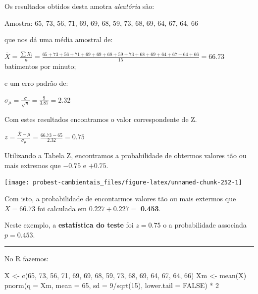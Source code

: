 \documentclass[
]{book}
\newenvironment{Shaded}{\begin{snugshade}}{\end{snugshade}}
\newcommand{\AttributeTok}[1]{\textcolor[rgb]{0.77,0.63,0.00}{#1}}
\newcommand{\ConstantTok}[1]{\textcolor[rgb]{0.00,0.00,0.00}{#1}}
\newcommand{\DecValTok}[1]{\textcolor[rgb]{0.00,0.00,0.81}{#1}}
\newcommand{\FunctionTok}[1]{\textcolor[rgb]{0.00,0.00,0.00}{#1}}
\newcommand{\NormalTok}[1]{#1}
\newcommand{\OtherTok}[1]{\textcolor[rgb]{0.56,0.35,0.01}{#1}}
\newcommand{\SpecialCharTok}[1]{\textcolor[rgb]{0.00,0.00,0.00}{#1}}
\begin{document}
Os resultados obtidos desta amotra \emph{aleatória} são:

Amostra: 65, 73, 56, 71, 69, 69, 68, 59, 73, 68, 69, 64, 67, 64, 66

que nos dá uma média amostral de:

\(\overline{X} = \frac{\sum{X_i}}{n} = \frac{65+73+56+71+69+69+68+59+73+68+69+64+67+64+66}{15} = 66.73\) batimentos por minuto;

e um erro padrão de:

\(\sigma_{\mu} = \frac{\sigma}{\sqrt{n}} = \frac{9}{3.87} = 2.32\)

Com estes resultados encontramos o valor correspondente de Z.

\(z = \frac{\overline{X} - \mu}{\sigma_{\mu}} = \frac{66.73 - 65}{2.32} = 0.75\)

Utilizando a Tabela Z, encontramos a probabilidade de obtermos valores tão ou mais extremos que \(-0.75\) e \(+0.75\).

\begin{center}\texttt{[image: probest-cambientais\_files/figure-latex/unnamed-chunk-252-1]} \end{center}

Com isto, a probabilidade de encontarmos valores tão ou mais extermos que \(\overline{X} = 66.73\) foi calculada em \(0.227 + 0.227 =\) \textbf{0.453}.

Neste exemplo, a \textbf{estatística do teste} foi \(z = 0.75\) o a probabilidade associada \(p = 0.453\).

\begin{center}\rule{0.5\linewidth}{0.5pt}\end{center}

No R fazemos:

\begin{Shaded}
\begin{Highlighting}[]
\NormalTok{X }\OtherTok{\textless{}{-}} \FunctionTok{c}\NormalTok{(}\DecValTok{65}\NormalTok{, }\DecValTok{73}\NormalTok{, }\DecValTok{56}\NormalTok{, }\DecValTok{71}\NormalTok{, }\DecValTok{69}\NormalTok{, }\DecValTok{69}\NormalTok{, }\DecValTok{68}\NormalTok{, }\DecValTok{59}\NormalTok{, }\DecValTok{73}\NormalTok{, }\DecValTok{68}\NormalTok{, }\DecValTok{69}\NormalTok{, }\DecValTok{64}\NormalTok{, }\DecValTok{67}\NormalTok{, }\DecValTok{64}\NormalTok{, }\DecValTok{66}\NormalTok{)}
\NormalTok{Xm }\OtherTok{\textless{}{-}} \FunctionTok{mean}\NormalTok{(X)}
\FunctionTok{pnorm}\NormalTok{(}\AttributeTok{q =}\NormalTok{ Xm, }\AttributeTok{mean =} \DecValTok{65}\NormalTok{, }\AttributeTok{sd =} \DecValTok{9}\SpecialCharTok{/}\FunctionTok{sqrt}\NormalTok{(}\DecValTok{15}\NormalTok{), }\AttributeTok{lower.tail =} \ConstantTok{FALSE}\NormalTok{) }\SpecialCharTok{*} \DecValTok{2}
\end{Highlighting}
\end{Shaded}
\end{document}
